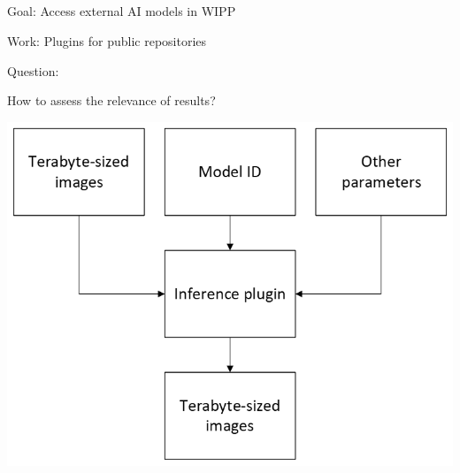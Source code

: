\subsection{\slidetitle}
\begin{frame}
  \frametitle{\sectiontitle}
  \framesubtitle{\slidetitle}

  \begin{minipage}[h!]{0.53\textwidth}
    Goal: Access external AI models in WIPP

    Work: Plugins for public repositories

    \bigskip

    Question:

    How to assess the relevance of results?

  \end{minipage}\hfill
  \begin{minipage}[h!]{0.46\textwidth}
    \includegraphics[scale=0.55]{./img/3_inference.png}
  \end{minipage}
\end{frame}

\def\slidetitle{Evaluate results}

